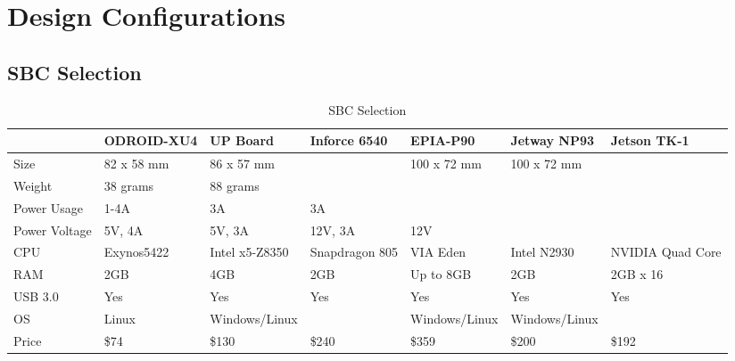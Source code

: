 \appendix

\chapter{Design Configurations} \pagebreak
\begin{landscape}
\section{SBC Selection}
    \begin{table}[h!]
    \caption{SBC Selection}
    \label{table:sbc_selection}
    \centering
    \begin{tabular}{|l|l|l|l|l|l|l|}
        \hline              & ODROID-XU4 & UP Board       & Inforce 6540   & EPIA-P90       & Jetway NP93   & Jetson TK-1      \\ \hline
        Size                & 82 x 58 mm & 86 x 57 mm     &                & 100 x 72 mm    & 100 x 72 mm   &                  \\
        Weight              & 38 grams   & 88 grams       &                &                &               &                  \\
        Power Usage         & 1-4A       & 3A             & 3A             &                &               &                  \\
        Power Voltage       & 5V, 4A     & 5V, 3A         & 12V, 3A        & 12V            &               &                  \\
        CPU                 & Exynos5422 & Intel x5-Z8350 & Snapdragon 805 & VIA Eden       & Intel N2930   & NVIDIA Quad Core \\
        RAM                 & 2GB        & 4GB            & 2GB            & Up to 8GB      & 2GB           & 2GB x 16         \\
        USB 3.0             & Yes        & Yes            & Yes            & Yes            & Yes           & Yes              \\
        OS                  & Linux      & Windows/Linux  &                & Windows/Linux  & Windows/Linux &                  \\
        Price               & \$74       & \$130          & \$240          & \$359          & \$200         & \$192            \\ \hline
    \end{tabular}
    \end{table}
\end{landscape} \par
